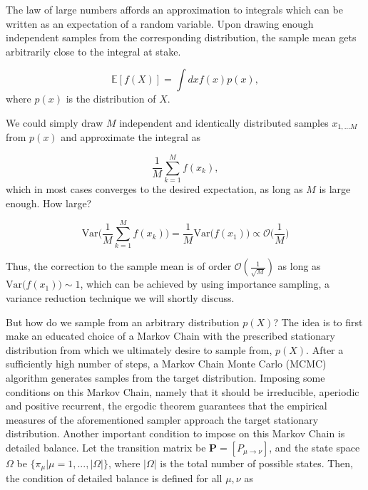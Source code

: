 The law of large numbers affords an approximation to integrals which can be written as an expectation of a random variable. Upon drawing enough independent samples from the corresponding distribution, the sample mean gets arbitrarily close to the integral at stake.

\begin{equation}\label{eq:int_mean}
\mathbb{E} [f(X)] = \int dx f(x) p(x),
\end{equation}
where $p(x)$ is the distribution of $X$. 

We could simply draw $M$ independent and identically distributed samples $x_{1,...M}$ from $p(x)$ and approximate the integral as

\begin{equation}
\frac{1}{M} \sum_{k=1}^M f (x_k) , 
\end{equation}
which in most cases converges to the desired expectation, as long as $M$ is large enough. How large?

\begin{equation}\label{eq:variance}
\text{Var}\bigg( \frac{1}{M} \sum_{k=1}^M f(x_k) \bigg) = \frac{1}{M} \text{Var}\bigg( f(x_1) \bigg) \propto \mathcal{O}\bigg(\frac{1}{M}\bigg)
\end{equation}

Thus, the correction to the sample mean is of order $\mathcal{O}(\frac{1}{\sqrt{M}})$ as long as $\text{Var}\big( f(x_1) \big) \sim 1$, which can be achieved by using importance sampling, a variance reduction technique we will shortly discuss.

But how do we sample from an arbitrary distribution $p(X)$? The idea is to first make an educated choice of a Markov Chain with the prescribed stationary distribution from which we ultimately desire to sample from, $p(X)$. After a sufficiently high number of steps, a Markov Chain Monte Carlo (MCMC) algorithm generates samples from the target distribution. Imposing some conditions on this Markov Chain, namely that it should be irreducible, aperiodic and positive recurrent, the ergodic theorem guarantees that the empirical measures of the aforementioned sampler approach the target stationary distribution. Another important condition to impose on this Markov Chain is detailed balance. Let the transition matrix be $\bm P = [P_{\mu \rightarrow \nu}]$, and the state space $\Omega$ be $\{\pi_\mu | \mu=1, ..., |\Omega| \}$, where $|\Omega|$ is the total number of possible states. Then, the condition of detailed balance is defined for all $\mu, \nu$ as

